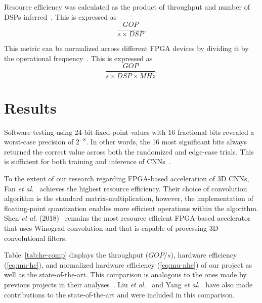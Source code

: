 \documentclass[
  10pt,
  \FORMAT-MODE,
  \REVIEW-MODE,
  \TWOSIDE-MODE
]{IEEEtran}
\begin{document}
  Resource efficiency was calculated as the product of throughput and number of DSPs inferred~\cite{fan2021high,li2022hardware,kyriakos2022resources,jiang2025fpga}. This is expressed as
  \begin{equation}\label{eq:mu-he}
    \frac{GOP}{s{\times}DSP}.
  \end{equation}

  This metric can be normalized across different FPGA devices by dividing it by the operational frequency~\cite{meyer2020evaluating, montgomerie2023pass, jiang2025fpga}. This is expressed as
  \begin{equation}\label{eq:mu-nhe}
    \frac{GOP}{s{\times}DSP{\times}MHz}.
  \end{equation}

\section{Results}\label{sec:res}
  Software testing using 24-bit fixed-point values with 16 fractional bits revealed a worst-case precision of $2^{-8}$. In other words, the 16 most significant bits always returned the correct value across both the randomized and edge-case trials. This is sufficient for both training and inference of CNNs~\cite{courbariaux2014training}.

  To the extent of our research regarding FPGA-based acceleration of 3D CNNs, Fan \textit{et al.}~\cite{fan2021high} achieves the highest resource efficiency. Their choice of convolution algorithm is the standard matrix-multiplication, however, the implementation of floating-point quantization enables more efficient operations within the algorithm. Shen \textit{et al.} (2018)~\cite{shen2018towards} remains the most resource efficient FPGA-based accelerator that uses Winograd convolution and that is capable of processing 3D convolutional filters.

  Table~\ref{tab:he-comp} displays the throughput ($GOP/s$), hardware efficiency (\ref{eq:mu-he}), and normalized hardware efficiency (\ref{eq:mu-nhe}) of our project as well as the state-of-the-art. This comparison is analogous to the ones made by previous projects in their analyses~\cite{shen2018towards,fan2021high}. Liu \textit{et al.}~\cite{liu2019uniform} and Yang \textit{et al.}~\cite{yang2023fgpa} have also made contributions to the state-of-the-art and were included in this comparison.
\end{document}
